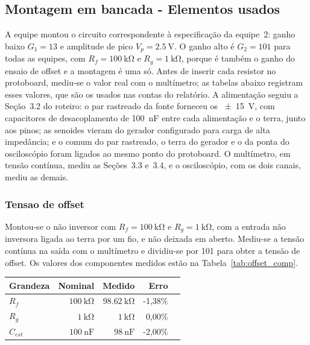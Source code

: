 \documentclass[11pt,a4paper]{article}
\begin{document}
\subsection{Montagem em bancada - Elementos usados}

A equipe montou o circuito correspondente à especificação da equipe~2: ganho baixo $G_1 = 13$ e amplitude de pico $V_p = \SI{2,5}{\volt}$. O ganho alto é $G_2 = 101$ para todas as equipes, com $R_f = \SI{100}{\kilo\ohm}$ e $R_g = \SI{1}{\kilo\ohm}$, porque é também o ganho do ensaio de offset e a montagem é uma só. Antes de inserir cada resistor no protoboard, mediu-se o valor real com o multímetro; as tabelas abaixo registram esses valores, que são os usados nas contas do relatório. A alimentação seguiu a Seção~3.2 do roteiro: o par rastreado da fonte forneceu os \SI{\pm 15}{\volt}, com capacitores de desacoplamento de \SI{100}{\nano\farad} entre cada alimentação e o terra, junto aos pinos; as senoides vieram do gerador configurado para carga de alta impedância; e o comum do par rastreado, o terra do gerador e o da ponta do osciloscópio foram ligados ao mesmo ponto do protoboard. O multímetro, em tensão contínua, mediu as Seções~3.3 e~3.4, e o osciloscópio, com os dois canais, mediu as demais.

\subsubsection{Tensao de offset}

Montou-se o não inversor com $R_f = \SI{100}{\kilo\ohm}$ e $R_g = \SI{1}{\kilo\ohm}$, com a entrada não inversora ligada ao terra por um fio, e não deixada em aberto. Mediu-se a tensão contínua na saída com o multímetro e dividiu-se por 101 para obter a tensão de offset. Os valores dos componentes medidos estão na Tabela~\ref{tab:offset_comp}.

\begin{center}
\begin{tabular}{@{}lrrrr@{}}
\toprule
\label{tab:offset_comp}
\textbf{Grandeza} & \textbf{Nominal} & \textbf{Medido} & \textbf{Erro} \\
\midrule
  $R_f$ & $\SI{100}{\kilo\ohm}$ & $\SI{98,62}{\kilo\ohm}$ & -1,38\% \\
  $R_g$ & $\SI{1}{\kilo\ohm}$ & $\SI{1}{\kilo\ohm}$ & 0,00\% \\
  $C_{est}$ & $\SI{100}{\nano\farad}$ & $\SI{98}{\nano\farad}$ & -2,00\% \\
\bottomrule
\end{tabular}
\end{center}
\end{document}
